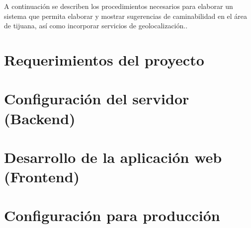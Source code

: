 A continuación se describen los procedimientos necesarios para elaborar un sistema que permita elaborar y mostrar sugerencias de caminabilidad en el área de tijuana, así como incorporar servicios de geolocalización..

\section{Requerimientos del proyecto}


\newpage
\section{Configuración del servidor (Backend)}


\newpage
\section{Desarrollo de la aplicación web (Frontend)}


\newpage
\section{Configuración para producción}
